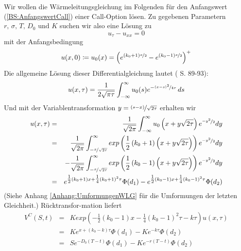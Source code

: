Wir wollen die Wärmeleitungsgleichung im Folgenden für den Anfangswert (\ref{BS:AnfangswertCall}) einer Call-Option lösen. Zu gegebenen Parametern $r,\,\sigma,\,T,\,D_0 \text{ und } K$ suchen wir also eine Lösung zu
\begin{equation}
u_{\tau} - u_{xx} = 0
\end{equation}
mit der Anfangsbedingung
\begin{equation}
u(x,0) \coloneqq u_0(x) = \left(e^{\left(k_0 + 1\right)\nicefrac{x}{2}} - e^{\left(k_0-1\right)\nicefrac{x}{2}}\right)^+
\end{equation}
Die allgemeine Lösung dieser Differentialgleichung lautet (\cite{WilmottDewynneHowison} S. 89-93):
\begin{equation*}
u(x,\tau) = \frac{1}{2\sqrt{\pi\tau}}\int _{-\infty}^{\infty} u_0(s)e^{-\nicefrac{\left(x-s\right)^2}{4\tau}}\, ds 
\end{equation*}
Und mit der Variablentransformation $y = \nicefrac{\left(s-x\right)}{\sqrt{2\tau}}$ erhalten wir
\begin{eqnarray*}
u(x,\tau) & = & \frac{1}{\sqrt{2\pi}}\int _{-\infty}^{\infty} u_0\left(x+y\sqrt{2\tau}\right)e^{\nicefrac{-y^2}{2}}dy \\
 & = & \frac{1}{\sqrt{2\pi}}\int _{-\nicefrac{x}{\sqrt{2\tau}}}^{\infty} exp\left(\frac{1}{2}\left(k_0+1\right)\left(x+y\sqrt{2\tau}\right)\right)e^{\nicefrac{-y^2}{2}}dy \\
 &   & - \frac{1}{\sqrt{2\pi}}\int _{-\nicefrac{x}{\sqrt{2\tau}}}^{\infty} exp\left(\frac{1}{2}\left(k_0-1\right)\left(x+y\sqrt{2\tau}\right)\right)e^{\nicefrac{-y^2}{2}}dy \\
 & = & e^{\tfrac{1}{2}\left(k_0 + 1\right)x + \tfrac{1}{4}\left(k_0 + 1\right)^2\tau}\Phi(d_1) - e^{\tfrac{1}{2}\left(k_0 - 1\right)x + \tfrac{1}{4}\left(k_0 - 1\right)^2\tau}\Phi(d_2)
\end{eqnarray*}
(Siehe Anhang \ref{Anhang:UmformungenWLG} für die Umformungen der letzten Gleichheit.) Rücktransfor-mation liefert
\begin{eqnarray*}
V^C(S,t) & = & Kexp\left(-\frac{1}{2}\left(k_0-1\right)x - \frac{1}{4}\left(k_0-1\right)^2\tau - k\tau\right)u(x,\tau) \\
& = & Ke^{x +\left(k_0-k\right)\tau}\Phi\left(d_1\right) - Ke^{-k\tau}\Phi\left(d_2\right) \\
& = & Se^{-D_0(T-t)}\Phi\left(d_1\right) - Ke^{-r(T-t)}\Phi\left(d_2\right)
\end{eqnarray*}

